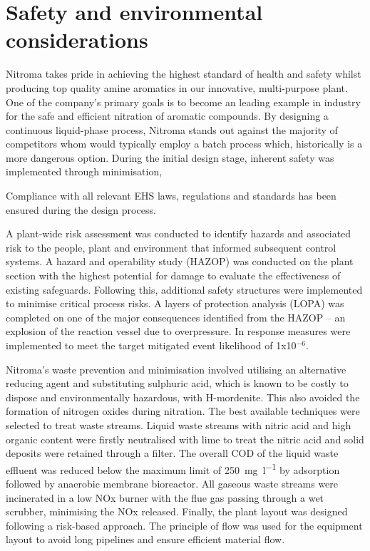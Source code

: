 \section*{Safety and environmental considerations}

Nitroma takes pride in achieving the highest standard of health and safety whilst producing top quality amine aromatics in our innovative, multi-purpose plant. One of the company's primary goals is to become an leading example in industry for the safe and efficient nitration of aromatic compounds. By designing a continuous liquid-phase process, Nitroma stands out against the majority of competitors whom would typically employ a batch process which, historically is a more dangerous option. During the initial design stage, inherent safety was implemented through minimisation, 

 


 Compliance with all relevant EHS laws, regulations and standards has been ensured during the design process. 
 
 A plant-wide risk assessment was conducted to identify hazards and associated risk to the people, plant and environment that informed subsequent control systems. A hazard and operability study (HAZOP) was conducted on the plant section with the highest potential for damage to evaluate the effectiveness of existing safeguards. Following this, additional safety structures were implemented to minimise critical process risks. A layers of protection analysis (LOPA) was completed on one of the major consequences identified from the HAZOP – an explosion of the reaction vessel due to overpressure. In response measures were implemented to meet the target mitigated event likelihood of 1x10$^{-6}$.  

Nitroma's waste prevention and minimisation involved utilising an alternative reducing agent and substituting sulphuric acid, which is known to be costly to dispose and environmentally hazardous, with H-mordenite. This also avoided the formation of nitrogen oxides during nitration. The best available techniques  were selected to treat waste streams. Liquid waste streams with nitric acid and high organic content were firstly neutralised with lime to treat the nitric acid and solid deposits were retained through a filter. The overall COD of the liquid waste effluent was reduced below the maximum limit of \SI{250}{\mg\per\litre} by adsorption followed by anaerobic membrane bioreactor. All gaseous waste streams were incinerated in a low NOx burner with the flue gas passing through a wet scrubber, minimising the NOx released. Finally, the plant layout was designed following a risk-based approach. The principle of flow was used for the equipment layout to avoid long pipelines and ensure efficient material flow. 